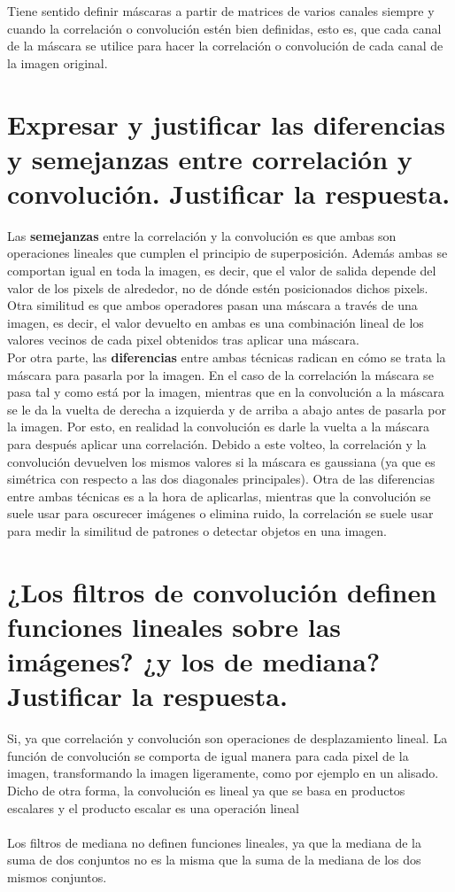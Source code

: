 Tiene sentido definir máscaras a partir de matrices de varios canales siempre y cuando la correlación o convolución estén bien definidas, esto es, que cada canal de la máscara se utilice para hacer la correlación o convolución de cada canal de la imagen original.

\newpage
\section{Expresar y justificar las diferencias y semejanzas entre correlación y convolución. Justificar la respuesta.}

Las \textbf{semejanzas} entre la correlación y la convolución es que ambas son operaciones lineales que cumplen el principio de superposición. Además ambas se comportan igual en toda la imagen, es decir, que el valor de salida depende del valor de los pixels de alrededor, no de dónde estén posicionados dichos pixels. Otra similitud es que ambos operadores pasan una máscara a través de una imagen, es decir, el valor devuelto en ambas es una combinación lineal de los valores vecinos de cada pixel obtenidos tras aplicar una máscara.\\

Por otra parte, las \textbf{diferencias} entre ambas técnicas radican en cómo se trata la máscara para pasarla por la imagen. En el caso de la correlación la máscara se pasa tal y como está por la imagen, mientras que en la convolución a la máscara se le da la vuelta de derecha a izquierda y de arriba a abajo antes de pasarla por la imagen. Por esto, en realidad la convolución es darle la vuelta a la máscara para después aplicar una correlación. Debido a este volteo, la correlación y la convolución devuelven los mismos valores si la máscara es gaussiana (ya que es simétrica con respecto a las dos diagonales principales).
Otra de las diferencias entre ambas técnicas es a la hora de aplicarlas, mientras que la convolución se suele usar para oscurecer imágenes o elimina ruido, la correlación se suele usar para medir la similitud de patrones o detectar objetos en una imagen.


\section{¿Los filtros de convolución definen funciones lineales sobre las imágenes? ¿y los de mediana? Justificar la respuesta.}

Si, ya que correlación y convolución son operaciones de desplazamiento lineal. La función de convolución se comporta de igual manera para cada pixel de la imagen, transformando la imagen ligeramente, como por ejemplo en un alisado. Dicho de otra forma, la convolución es lineal ya que se basa en productos escalares y el producto escalar es una operación lineal\\
\\
Los filtros de mediana no definen funciones lineales,  ya que la mediana de la suma de dos conjuntos no es la misma que la suma de la mediana de los dos mismos conjuntos.
\newpage
